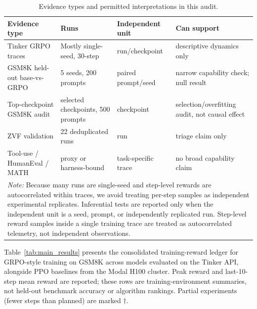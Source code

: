 \documentclass{article}
\begin{document}
\begin{table}[htbp]
\centering
\caption{Evidence types and permitted interpretations in this audit.}
\label{tab:evidence_types_detail}
\scriptsize
\begin{tabular}{p{3.2cm}p{3.0cm}p{2.5cm}p{2.5cm}}
\toprule
\textbf{Evidence type} & \textbf{Runs} & \textbf{Independent unit} & \textbf{Can support} \\
\midrule
Tinker GRPO traces & Mostly single-seed, 30-step & run/checkpoint & descriptive dynamics only \\
GSM8K held-out base-vs-GRPO & 5 seeds, 200 prompts & paired prompt/seed & narrow capability check; null result \\
Top-checkpoint GSM8K audit & selected checkpoints, 500 prompts & checkpoint & selection/overfitting audit, not causal effect \\
ZVF validation & 22 deduplicated runs & run & triage claim only \\
Tool-use / HumanEval / MATH & proxy or harness-bound & task-specific trace & no broad capability claim \\
\midrule
\multicolumn{4}{p{11.2cm}}{\small \textit{Note:} Because many runs are single-seed and step-level rewards are autocorrelated within traces, we avoid treating per-step samples as independent experimental replicates. Inferential tests are reported only when the independent unit is a seed, prompt, or independently replicated run. Step-level reward samples inside a single training trace are treated as autocorrelated telemetry, not independent observations.} \\
\bottomrule
\end{tabular}
\end{table}

Table~\ref{tab:main_results} presents the consolidated training-reward ledger for
GRPO-style training on GSM8K across models evaluated on the Tinker API, alongside
PPO baselines from the Modal H100 cluster. Peak reward and last-10-step mean
reward are reported; these rows are training-environment summaries, not held-out
benchmark accuracy or algorithm rankings.
Partial experiments (fewer steps than planned) are marked $\dagger$.
\end{document}
